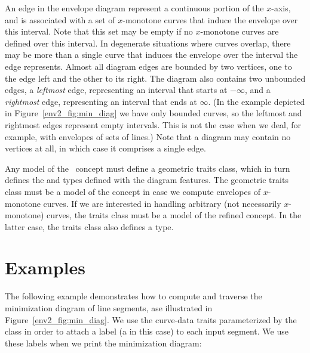 An edge in the envelope diagram represent a continuous portion of the
$x$-axis, and is associated with a set of $x$-monotone curves that
induce the envelope over this interval. Note that this set may be
empty if no $x$-monotone curves are defined over this interval. In
degenerate situations where curves overlap, there may be more than
a single curve that induces the envelope over the interval the edge
represents. Almost all diagram edges are bounded by two vertices, one
to the edge left and the other to its right. The diagram also contains
two unbounded edges, a {\em leftmost} edge, representing an interval
that starts at $-\infty$, and a {\em rightmost} edge, representing an
interval that ends at $\infty$. (In the example depicted in 
Figure~\ref{env2_fig:min_diag} we have only bounded curves, so the
leftmost and rightmost edges represent empty intervals. This is not
the case when we deal, for example, with envelopes of sets of lines.)
Note that a diagram may contain no vertices at all, in which case it
comprises a single edge.

Any model of the \ccRefName\ concept must define a geometric
traits class, which in turn defines the  and 
 types defined with the diagram features.
The geometric traits class must be a model of the 
 concept in case we compute
envelopes of $x$-monotone curves. If we are interested in handling
arbitrary (not necessarily $x$-monotone) curves, the traits class
must be a model of the refined  concept.
In the latter case, the traits class also defines a 
type.

\section{Examples}

The following example demonstrates how to compute and traverse the
minimization diagram of line segments, ase illustrated in
Figure~\ref{env2_fig:min_diag}. We use the curve-data traits
parameterized by the  class in order to
attach a label (a  in this case) to each input segment.
We use these labels when we print the minimization diagram:


